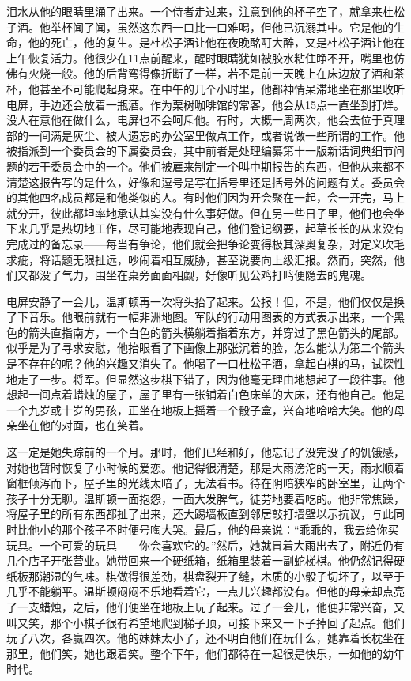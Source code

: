 泪水从他的眼睛里涌了出来。一个侍者走过来，注意到他的杯子空了，就拿来杜松子酒。他举杯闻了闻，虽然这东西一口比一口难喝，但他已沉溺其中。它是他的生命，他的死亡，他的复生。是杜松子酒让他在夜晚酩酊大醉，又是杜松子酒让他在上午恢复活力。他很少在11点前醒来，醒时眼睛犹如被胶水粘住睁不开，嘴里也仿佛有火烧一般。他的后背弯得像折断了一样，若不是前一天晚上在床边放了酒和茶杯，他甚至不可能爬起身来。在中午的几个小时里，他都神情呆滞地坐在那里收听电屏，手边还会放着一瓶酒。作为栗树咖啡馆的常客，他会从15点一直坐到打烊。没人在意他在做什么，电屏也不会呵斥他。有时，大概一周两次，他会去位于真理部的一间满是灰尘、被人遗忘的办公室里做点工作，或者说做一些所谓的工作。他被指派到一个委员会的下属委员会，其中前者是处理编纂第十一版新话词典细节问题的若干委员会中的一个。他们被雇来制定一个叫中期报告的东西，但他从来都不清楚这报告写的是什么，好像和逗号是写在括号里还是括号外的问题有关。委员会的其他四名成员都是和他类似的人。有时他们因为开会聚在一起，会一开完，马上就分开，彼此都坦率地承认其实没有什么事好做。但在另一些日子里，他们也会坐下来几乎是热切地工作，尽可能地表现自己，他们登记纲要，起草长长的从来没有完成过的备忘录——每当有争论，他们就会把争论变得极其深奥复杂，对定义吹毛求疵，将话题无限扯远，吵闹着相互威胁，甚至说要向上级汇报。然而，突然，他们又都没了气力，围坐在桌旁面面相觑，好像听见公鸡打鸣便隐去的鬼魂。

电屏安静了一会儿，温斯顿再一次将头抬了起来。公报！但，不是，他们仅仅是换了下音乐。他眼前就有一幅非洲地图。军队的行动用图表的方式表示出来，一个黑色的箭头直指南方，一个白色的箭头横躺着指着东方，并穿过了黑色箭头的尾部。似乎是为了寻求安慰，他抬眼看了下画像上那张沉着的脸，怎么能认为第二个箭头是不存在的呢？他的兴趣又消失了。他喝了一口杜松子酒，拿起白棋的马，试探性地走了一步。将军。但显然这步棋下错了，因为他毫无理由地想起了一段往事。他想起一间点着蜡烛的屋子，屋子里有一张铺着白色床单的大床，还有他自己。他是一个九岁或十岁的男孩，正坐在地板上摇着一个骰子盒，兴奋地哈哈大笑。他的母亲坐在他的对面，也在笑着。

这一定是她失踪前的一个月。那时，他们已经和好，他忘记了没完没了的饥饿感，对她也暂时恢复了小时候的爱恋。他记得很清楚，那是大雨滂沱的一天，雨水顺着窗框倾泻而下，屋子里的光线太暗了，无法看书。待在阴暗狭窄的卧室里，让两个孩子十分无聊。温斯顿一面抱怨，一面大发脾气，徒劳地要着吃的。他非常焦躁，将屋子里的所有东西都扯了出来，还大踢墙板直到邻居敲打墙壁以示抗议，与此同时比他小的那个孩子不时便号啕大哭。最后，他的母亲说：``乖乖的，我去给你买玩具。一个可爱的玩具——你会喜欢它的。''然后，她就冒着大雨出去了，附近仍有几个店子开张营业。她带回来一个硬纸箱，纸箱里装着一副蛇梯棋。他仍然记得硬纸板那潮湿的气味。棋做得很差劲，棋盘裂开了缝，木质的小骰子切坏了，以至于几乎不能躺平。温斯顿闷闷不乐地看着它，一点儿兴趣都没有。但他的母亲却点亮了一支蜡烛，之后，他们便坐在地板上玩了起来。过了一会儿，他便非常兴奋，又叫又笑，那个小棋子很有希望地爬到梯子顶，可接下来又一下子掉回了起点。他们玩了八次，各赢四次。他的妹妹太小了，还不明白他们在玩什么，她靠着长枕坐在那里，他们笑，她也跟着笑。整个下午，他们都待在一起很是快乐，一如他的幼年时代。

